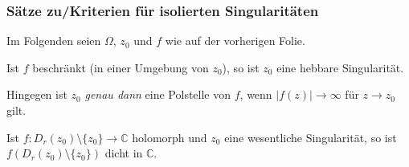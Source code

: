 \documentclass[10pt]{beamer}
\begin{document}
\begin{frame}
	\frametitle{Sätze zu/Kriterien für isolierten Singularitäten}
	Im Folgenden seien $\Omega$, $z_0$ und $f$ wie auf der vorherigen Folie.
	\pause
	\begin{theorem}
		Ist $f$ beschränkt (in einer Umgebung von $z_0$), so ist $z_0$ eine hebbare Singularität.
	\end{theorem}
	\pause
	Hingegen ist $z_0$ \emph{genau dann} eine Polstelle von $f$, wenn $\lvert f(z) \rvert \to \infty$ für $z \to z_0$ gilt.
	\pause
	\begin{theorem}
		Ist $f \colon D_r(z_0) \setminus \{z_0\} \to \mathbb{C}$ holomorph und $z_0$ eine wesentliche Singularität, so ist $f(D_r(z_0) \setminus \{z_0\})$ dicht in $\mathbb{C}$.
	\end{theorem}
\end{frame}
\end{document}

